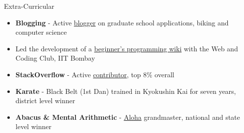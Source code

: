 \documentclass{resume} %
\begin{document}
\begin{rSection}{Extra-Curricular}
\begin{itemize}[leftmargin=*]
\item \textbf{Blogging} - Active \href{http://martiansideofthemoon.github.io/archive.html}{blogger} on graduate school applications, biking and computer science
\item Led the development of a \href{https://www.wncc-iitb.org/wiki/index.php/The_Web_and_Coding_Club}{beginner's programming wiki} with the Web and Coding Club, IIT Bombay
\item \textbf{StackOverflow} - Active \href{https://stackoverflow.com/users/5080995/martianwars}{contributor}, top 8\% overall
\item \textbf{Karate} - Black Belt (1st Dan) trained in Kyokushin Kai for seven years, district level winner
\item \textbf{Abacus \& Mental Arithmetic} - \href{https://alohamindmath.com/}{Aloha} grandmaster, national and state level winner
\end{itemize}
\end{rSection}
\end{document}
